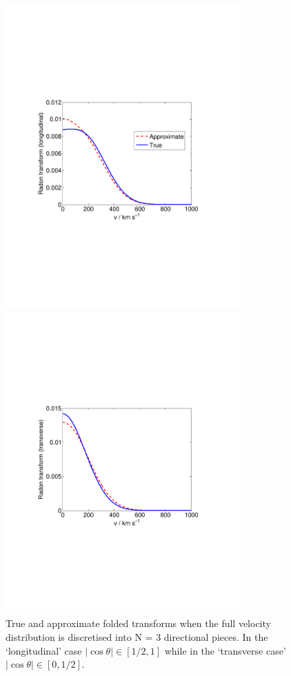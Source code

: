 \begin{figure}[t]
\label{fig:directional:radonN3folded}
  \centering
  \includegraphics[trim={2cm 8cm 2cm 8cm},clip,width=0.80\textwidth]{Directional/N3-longitudinal.pdf}

  \includegraphics[trim={2cm 8cm 2cm 8cm},clip,width=0.80\textwidth]{Directional/N3-transverse.pdf}

\caption[True and approximate folded Radon transforms for $N=3$ components]{True and approximate folded transforms when the full velocity distribution is discretised into N = 3 directional pieces. In the `longitudinal' case $|\cos\theta| \in [1/2,1]$ while in the `transverse case' $|\cos\theta| \in [0, 1/2]$.}
\end{figure}

